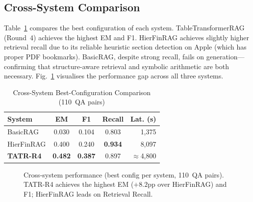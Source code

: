 \documentclass[conference]{IEEEtran}
\newcommand{\best}[1]{\textbf{#1}}
\begin{document}
\subsection{Cross-System Comparison}

Table~\ref{tab:cross} compares the best configuration of each system.
TableTransformerRAG (Round~4) achieves the highest EM and F1. HierFinRAG
achieves slightly higher retrieval recall due to its reliable heuristic
section detection on Apple (which has proper PDF bookmarks). BasicRAG, despite
strong recall, fails on generation---confirming that structure-aware retrieval
and symbolic arithmetic are both necessary.
Fig.~\ref{fig:crosssys} visualises the performance gap across all three systems.

\begin{table}[htbp]
\caption{Cross-System Best-Configuration Comparison (110~QA pairs)}
\label{tab:cross}
\centering
\renewcommand{\arraystretch}{1.2}
\begin{tabular}{l c c c r}
\toprule
\textbf{System} & \textbf{EM} & \textbf{F1} & \textbf{Recall} & \textbf{Lat. (s)} \\
\midrule
BasicRAG        & 0.030 & 0.104 & 0.803 & 1,375 \\
HierFinRAG      & 0.400 & 0.240 & \best{0.934} & 8,097 \\
\rowcolor{bestrow}
\textbf{TATR-R4} & \best{0.482} & \best{0.387} & 0.897 & $\approx$4,800 \\
\bottomrule
\end{tabular}
\end{table}

\begin{figure}[htbp]
\centering
{}
\caption{Cross-system performance (best config per system, 110~QA pairs).
TATR-R4 achieves the highest EM ($+8.2$pp over HierFinRAG) and F1; HierFinRAG
leads on Retrieval Recall.}
\label{fig:crosssys}
\end{figure}
\end{document}
